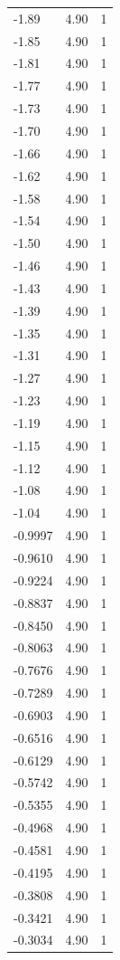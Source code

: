 \begin{longtable}{lrr}
  -1.89 & 4.90 & 1 \\
  -1.85 & 4.90 & 1 \\
  -1.81 & 4.90 & 1 \\
  -1.77 & 4.90 & 1 \\
  -1.73 & 4.90 & 1 \\
  -1.70 & 4.90 & 1 \\
  -1.66 & 4.90 & 1 \\
  -1.62 & 4.90 & 1 \\
  -1.58 & 4.90 & 1 \\
  -1.54 & 4.90 & 1 \\
  -1.50 & 4.90 & 1 \\
  -1.46 & 4.90 & 1 \\
  -1.43 & 4.90 & 1 \\
  -1.39 & 4.90 & 1 \\
  -1.35 & 4.90 & 1 \\
  -1.31 & 4.90 & 1 \\
  -1.27 & 4.90 & 1 \\
  -1.23 & 4.90 & 1 \\
  -1.19 & 4.90 & 1 \\
  -1.15 & 4.90 & 1 \\
  -1.12 & 4.90 & 1 \\
  -1.08 & 4.90 & 1 \\
  -1.04 & 4.90 & 1 \\
  -0.9997 & 4.90 & 1 \\
  -0.9610 & 4.90 & 1 \\
  -0.9224 & 4.90 & 1 \\
  -0.8837 & 4.90 & 1 \\
  -0.8450 & 4.90 & 1 \\
  -0.8063 & 4.90 & 1 \\
  -0.7676 & 4.90 & 1 \\
  -0.7289 & 4.90 & 1 \\
  -0.6903 & 4.90 & 1 \\
  -0.6516 & 4.90 & 1 \\
  -0.6129 & 4.90 & 1 \\
  -0.5742 & 4.90 & 1 \\
  -0.5355 & 4.90 & 1 \\
  -0.4968 & 4.90 & 1 \\
  -0.4581 & 4.90 & 1 \\
  -0.4195 & 4.90 & 1 \\
  -0.3808 & 4.90 & 1 \\
  -0.3421 & 4.90 & 1 \\
  -0.3034 & 4.90 & 1 \\

\end{longtable}
